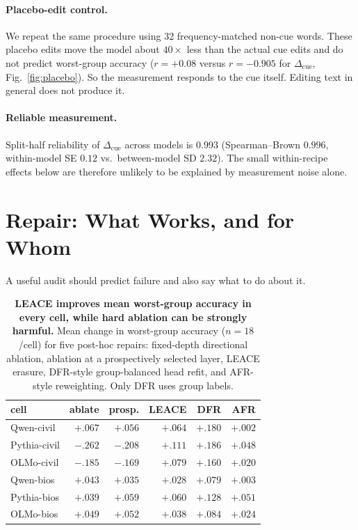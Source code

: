 \documentclass[11pt]{article}
\newcommand{\cued}{\ensuremath{\Delta_{\mathrm{cue}}}}
\begin{document}
\paragraph{Placebo-edit control.}
We repeat the same procedure using 32 frequency-matched non-cue words. These
placebo edits move the model about $40\times$ less than the actual cue edits
and do not predict worst-group accuracy
($r{=}{+}0.08$ versus $r{=}{-}0.905$ for \cued{},
Fig.~\ref{fig:placebo}). So the measurement responds to the cue itself. Editing text in general does
not produce it.

\paragraph{Reliable measurement.}
Split-half reliability of \cued{} across models is $0.993$
(Spearman--Brown $0.996$, within-model SE $0.12$ vs.\ between-model SD
$2.32$). The small within-recipe effects below are therefore unlikely to be explained
by measurement noise alone.

\section{Repair: What Works, and for Whom}
\label{sec:repair}

A useful audit should predict failure and also say what to do about it.

\begin{table}[t]
\centering\small
\setlength{\tabcolsep}{4.2pt}
\begin{tabular}{lrrrrr}
\toprule
cell & ablate & prosp. & LEACE & DFR & AFR \\
\midrule
Qwen-civil   & $+.067$ & $+.056$ & $+.064$ & $+.180$ & $+.002$ \\
Pythia-civil & $-.262$ & $-.208$ & $+.111$ & $+.186$ & $+.048$ \\
OLMo-civil   & $-.185$ & $-.169$ & $+.079$ & $+.160$ & $+.020$ \\
Qwen-bios    & $+.043$ & $+.035$ & $+.028$ & $+.079$ & $+.003$ \\
Pythia-bios  & $+.039$ & $+.059$ & $+.060$ & $+.128$ & $+.051$ \\
OLMo-bios    & $+.049$ & $+.052$ & $+.038$ & $+.084$ & $+.024$ \\
\bottomrule
\end{tabular}
\caption{\textbf{LEACE improves mean worst-group accuracy in every cell, while hard ablation can be strongly harmful.} Mean change in worst-group accuracy ($n{=}18$/cell) for five post-hoc repairs: fixed-depth directional ablation, ablation at a prospectively selected layer, LEACE erasure, DFR-style group-balanced head refit, and AFR-style reweighting. Only DFR uses group labels.}
\label{tab:repair}
\end{table}
\end{document}
